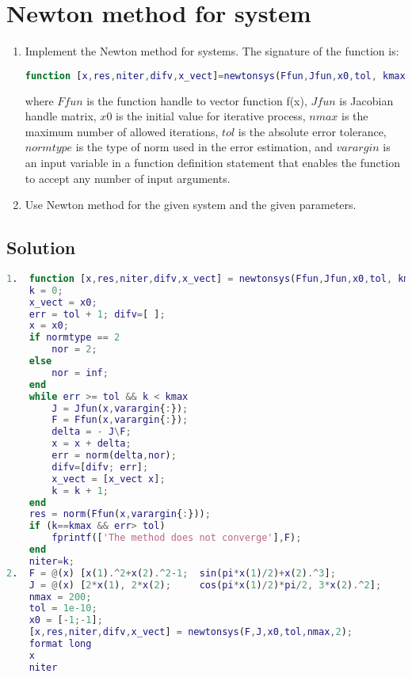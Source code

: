 \documentclass[12pt, a4paper]{report}
\newtheorem[style=M,bodystyle=\normalfont]{theorem}{Theorem}
\newtheorem[style=M,bodystyle=\normalfont]{corollary}{Corollary}
\newtheorem[style=M,bodystyle=\normalfont]{lemma}{Lemma}
\newtheorem[style=M,bodystyle=\normalfont]{definition}{Definition}
\begin{document}
    \newpage

    \section{Newton method for system}
        \begin{enumerate}
            \item Implement the Newton method for systems. The signature of the function is:
                \begin{lstlisting}[language=Matlab]
function [x,res,niter,difv,x_vect]=newtonsys(Ffun,Jfun,x0,tol, kmax,normtype,varargin)
                \end{lstlisting}  
                where $Ffun$ is the function handle to vector function f(x), $Jfun$ is Jacobian handle matrix, $x0$ is the initial value for iterative process, $nmax$ is the 
                maximum number of allowed iterations, $tol$ is the absolute error tolerance, $normtype$ is the type of norm used in the error estimation, and $varargin$ is an input 
                variable in a function definition statement that enables the function to accept any number of input arguments. 
            \item Use Newton method for the given system and the given parameters. 
        \end{enumerate}
    \subsection*{Solution}
        \begin{lstlisting}[language=Matlab]
1.  function [x,res,niter,difv,x_vect] = newtonsys(Ffun,Jfun,x0,tol, kmax,normtype,varargin)
    k = 0;
    x_vect = x0;
    err = tol + 1; difv=[ ];
    x = x0;
    if normtype == 2
        nor = 2;
    else
        nor = inf;
    end
    while err >= tol && k < kmax
        J = Jfun(x,varargin{:});
        F = Ffun(x,varargin{:});
        delta = - J\F;
        x = x + delta;
        err = norm(delta,nor); 
        difv=[difv; err];
        x_vect = [x_vect x];
        k = k + 1;
    end
    res = norm(Ffun(x,varargin{:}));
    if (k==kmax && err> tol)
        fprintf(['The method does not converge'],F);
    end
    niter=k;          
2.  F = @(x) [x(1).^2+x(2).^2-1;  sin(pi*x(1)/2)+x(2).^3];
    J = @(x) [2*x(1), 2*x(2);     cos(pi*x(1)/2)*pi/2, 3*x(2).^2];
    nmax = 200;
    tol = 1e-10;
    x0 = [-1;-1];
    [x,res,niter,difv,x_vect] = newtonsys(F,J,x0,tol,nmax,2);
    format long                       
    x
    niter
        \end{lstlisting}  
\end{document}
